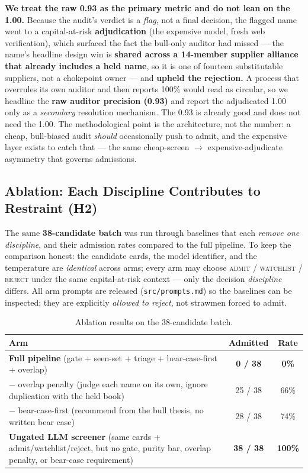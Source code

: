 \documentclass[11pt]{article}
\begin{document}
\textbf{We treat the raw 0.93 as the primary metric and do not lean on the 1.00.}
Because the audit's verdict is a \emph{flag}, not a final decision, the flagged
name went to a capital-at-risk \textbf{adjudication} (the expensive model, fresh
web verification), which surfaced the fact the bull-only auditor had missed ---
the name's headline design win is \textbf{shared across a 14-member supplier
alliance that already includes a held name}, so it is one of fourteen
substitutable suppliers, not a chokepoint owner --- and \textbf{upheld the
rejection.} A process that overrules its own auditor and then reports 100\%
would read as circular, so we headline the \textbf{raw auditor precision (0.93)}
and report the adjudicated 1.00 only as a \emph{secondary} resolution mechanism.
The 0.93 is already good and does not need the 1.00. The methodological point is
the architecture, not the number: a cheap, bull-biased audit \emph{should}
occasionally push to admit, and the expensive layer exists to catch that --- the
same cheap-screen $\to$ expensive-adjudicate asymmetry that governs admissions.

\subsection{Ablation: Each Discipline Contributes to Restraint (H2)}

The same \textbf{38-candidate batch} was run through baselines that each
\emph{remove one discipline}, and their admission rates compared to the full
pipeline. To keep the comparison honest: the candidate cards, the model
identifier, and the temperature are \emph{identical} across arms; every arm may
choose \textsc{admit} / \textsc{watchlist} / \textsc{reject} under the same
capital-at-risk context --- only the decision \emph{discipline} differs. All arm
prompts are released (\texttt{src/prompts.md}) so the baselines can be inspected;
they are explicitly \emph{allowed to reject}, not strawmen forced to admit.

\begin{table}[h]
\centering
\begin{tabularx}{\linewidth}{@{}Lcc@{}}
\toprule
\textbf{Arm} & \textbf{Admitted} & \textbf{Rate} \\
\midrule
\textbf{Full pipeline} (gate + seen-set + triage + bear-case-first + overlap)
  & \textbf{0 / 38} & \textbf{0\%} \\
$-$ overlap penalty (judge each name on its own, ignore duplication with the
  held book)
  & 25 / 38 & 66\% \\
$-$ bear-case-first (recommend from the bull thesis, no written bear case)
  & 28 / 38 & 74\% \\
\textbf{Ungated LLM screener} (same cards + admit/watchlist/reject, but no gate,
  purity bar, overlap penalty, or bear-case requirement)
  & \textbf{38 / 38} & \textbf{100\%} \\
\bottomrule
\end{tabularx}
\caption{Ablation results on the 38-candidate batch.}
\end{table}
\end{document}
